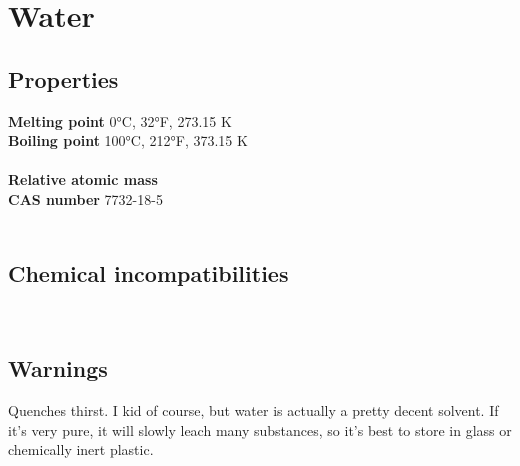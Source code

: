 \section{Water}
\label{sec:chem-7732-18-5}
\subsection{Properties}
\textbf{Melting point} 0°C, 32°F, 273.15 K\\
\textbf{Boiling point} 100°C, 212°F, 373.15 K\\
\\
\textbf{Relative atomic mass} \\
\textbf{CAS number} 7732-18-5\\
\\
\subsection{Chemical incompatibilities}
\\
\subsection{Warnings}
Quenches thirst.  I kid of course, but water is actually a pretty decent solvent.  If it's very pure, it will slowly leach many substances, so it's best to store in glass or chemically inert plastic.\\